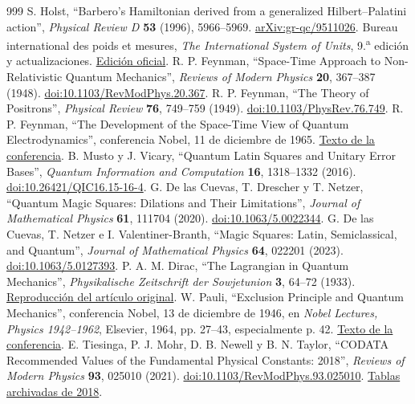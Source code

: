 \begin{thebibliography}{999}
 S. Holst, ``Barbero's Hamiltonian derived from a generalized Hilbert--Palatini action'', \emph{Physical Review D} \textbf{53} (1996), 5966--5969. \href{https://arxiv.org/abs/gr-qc/9511026}{arXiv:gr-qc/9511026}.
 Bureau international des poids et mesures, \emph{The International System of Units}, 9.\textsuperscript{a} edición y actualizaciones. \href{https://www.bipm.org/en/publications/si-brochure}{Edición oficial}.
 R. P. Feynman, ``Space-Time Approach to Non-Relativistic Quantum Mechanics'', \emph{Reviews of Modern Physics} \textbf{20}, 367--387 (1948). \href{https://doi.org/10.1103/RevModPhys.20.367}{doi:10.1103/RevModPhys.20.367}.
 R. P. Feynman, ``The Theory of Positrons'', \emph{Physical Review} \textbf{76}, 749--759 (1949). \href{https://doi.org/10.1103/PhysRev.76.749}{doi:10.1103/PhysRev.76.749}.
 R. P. Feynman, ``The Development of the Space-Time View of Quantum Electrodynamics'', conferencia Nobel, 11 de diciembre de 1965. \href{https://www.nobelprize.org/prizes/physics/1965/feynman/lecture/}{Texto de la conferencia}.
 B. Musto y J. Vicary, ``Quantum Latin Squares and Unitary Error Bases'', \emph{Quantum Information and Computation} \textbf{16}, 1318--1332 (2016). \href{https://doi.org/10.26421/QIC16.15-16-4}{doi:10.26421/QIC16.15-16-4}.
 G. De las Cuevas, T. Drescher y T. Netzer, ``Quantum Magic Squares: Dilations and Their Limitations'', \emph{Journal of Mathematical Physics} \textbf{61}, 111704 (2020). \href{https://doi.org/10.1063/5.0022344}{doi:10.1063/5.0022344}.
 G. De las Cuevas, T. Netzer e I. Valentiner-Branth, ``Magic Squares: Latin, Semiclassical, and Quantum'', \emph{Journal of Mathematical Physics} \textbf{64}, 022201 (2023). \href{https://doi.org/10.1063/5.0127393}{doi:10.1063/5.0127393}.
 P. A. M. Dirac, ``The Lagrangian in Quantum Mechanics'', \emph{Physikalische Zeitschrift der Sowjetunion} \textbf{3}, 64--72 (1933). \href{https://www.informationphilosopher.com/solutions/scientists/dirac/Lagrangian_1933.pdf}{Reproducción del artículo original}.
 W. Pauli, ``Exclusion Principle and Quantum Mechanics'', conferencia Nobel, 13 de diciembre de 1946, en \emph{Nobel Lectures, Physics 1942--1962}, Elsevier, 1964, pp. 27--43, especialmente p. 42. \href{https://www.nobelprize.org/uploads/2018/06/pauli-lecture.pdf}{Texto de la conferencia}.
 E. Tiesinga, P. J. Mohr, D. B. Newell y B. N. Taylor, ``CODATA Recommended Values of the Fundamental Physical Constants: 2018'', \emph{Reviews of Modern Physics} \textbf{93}, 025010 (2021). \href{https://doi.org/10.1103/RevModPhys.93.025010}{doi:10.1103/RevModPhys.93.025010}. \href{https://physics.nist.gov/cuu/Constants/ArchiveASCII/allascii_2018.txt}{Tablas archivadas de 2018}.

\end{thebibliography}

